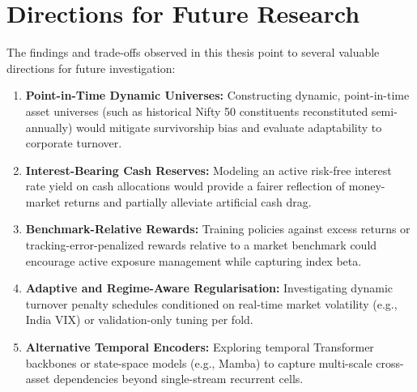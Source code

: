 \section{Directions for Future Research}
The findings and trade-offs observed in this thesis point to several valuable directions for future investigation:
\begin{enumerate}
    \item \textbf{Point-in-Time Dynamic Universes:} Constructing dynamic, point-in-time asset universes (such as historical Nifty 50 constituents reconstituted semi-annually) would mitigate survivorship bias and evaluate adaptability to corporate turnover.
    \item \textbf{Interest-Bearing Cash Reserves:} Modeling an active risk-free interest rate yield on cash allocations would provide a fairer reflection of money-market returns and partially alleviate artificial cash drag.
    \item \textbf{Benchmark-Relative Rewards:} Training policies against excess returns or tracking-error-penalized rewards relative to a market benchmark could encourage active exposure management while capturing index beta.
    \item \textbf{Adaptive and Regime-Aware Regularisation:} Investigating dynamic turnover penalty schedules conditioned on real-time market volatility (e.g., India VIX) or validation-only tuning per fold.
    \item \textbf{Alternative Temporal Encoders:} Exploring temporal Transformer backbones or state-space models (e.g., Mamba) to capture multi-scale cross-asset dependencies beyond single-stream recurrent cells.
\end{enumerate}
